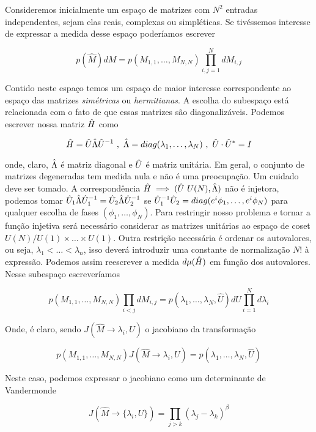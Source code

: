 Consideremos inicialmente um espaço de matrizes com $N^2$ entradas independentes, sejam elas reais, complexas ou simpléticas. Se tivéssemos interesse de expressar a medida desse espaço poderíamos escrever

\begin{equation}
	p(\hat{M}) dM = p(M_{1,1}, \dots, M_{N,N}) \prod_{i,j=1}^{N} dM_{i,j}
\end{equation}

Contido neste espaço temos um espaço de maior interesse correspondente ao espaço das matrizes \textit{simétricas} ou \textit{hermitianas}. A escolha do subespaço está relacionada com o fato  de que essas matrizes são diagonalizáveis. Podemos escrever nossa matriz $\hat H$ como 

\[
\hat H = \hat U \hat\Lambda \hat U^{-1} \ , \ \hat\Lambda = diag(\lambda_1, \dots, \lambda_N) \ , \ \hat U\cdot\hat U^* = I
\]

 onde, claro, $\hat\Lambda$ é matriz diagonal e $\hat U$ é matriz unitária. Em geral, o conjunto de matrizes degeneradas tem medida nula e não é uma preocupação.  Um cuidado deve ser tomado. A correspondência $\hat H \implies (\hat U \ U(N), \hat\Lambda)$ não é injetora, podemos tomar $\hat U_1 \hat\Lambda \hat U_1^{-1} = \hat U_2 \hat\Lambda \hat U_2^{-1}$ se $\hat U_1^{-1} \hat U_2 = diag(e^i\phi_1, \dots, e^i\phi_N)$ para qualquer escolha de fases $(\phi_1, \dots, \phi_N)$. Para restringir nosso problema e tornar a função injetiva será necessário considerar as matrizes unitárias ao espaço de coset  $U(N) / U(1) \times \dots \times U(1)$.  Outra restrição necessária é ordenar os autovalores, ou seja, $\lambda_1 < \dots < \lambda_n$, isso deverá introduzir uma constante de normalização $N!$ à expressão. Podemos assim reescrever a medida $d\mu(\hat H)$ em função dos autovalores. Nesse subespaço escreveríamos
 
\[
	p(M_{1,1}, \dots, M_{N,N}) \prod_{i<j} dM_{i,j} = p(\lambda_1, \dots, \lambda_N, \hat{U}) dU \prod_{i=1}^N d\lambda_{i}
\]

Onde, é claro, sendo $J(\hat{M} \rightarrow {\lambda_i, U})$ o jacobiano da transformação

\[
		p(M_{1,1}, \dots, M_{N,N}) J(\hat{M} \rightarrow {\lambda_i, U})= p(\lambda_1, \dots, \lambda_N, \hat{U})
\]

Neste caso, podemos expressar o jacobiano como um determinante de Vandermonde

\begin{equation}
	J(\hat{M} \rightarrow \{\lambda_i, U\}) = \prod_{j>k} (\lambda_j - \lambda_{k})^\beta
\end{equation}

